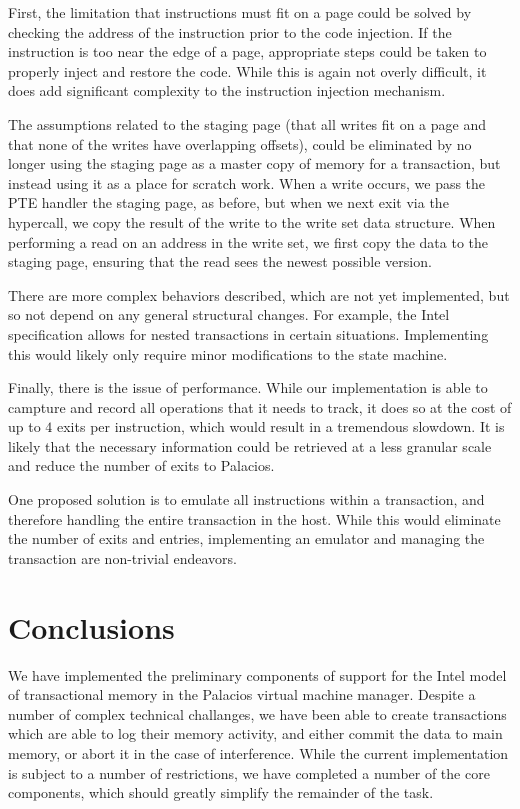\documentclass{acm_proc_article-sp}
\begin{document}
First, the limitation that instructions must fit on a page could be solved by
checking the address of the instruction prior to the code injection. If the 
instruction is too near the edge of a page, appropriate steps could be taken
to properly inject and restore the code. While this is again not overly 
difficult, it does add significant complexity to the instruction injection
mechanism.

The assumptions related to the staging page (that all writes fit on a page
and that none of the writes have overlapping offsets), could be eliminated
by no longer using the staging page as a master copy of memory for a 
transaction, but instead using it as a place for scratch work. When a 
write occurs, we pass the PTE handler the staging page, as before, but when we 
next exit via the hypercall, we copy the result of the write to the write set
data structure. When performing a read on an address in the write set,
we first copy the data to the staging page, ensuring that the read sees the
newest possible version.

There are more complex behaviors described, which are not yet
implemented, but so not depend on any general structural changes. For example,
the Intel specification allows for nested transactions in certain situations.
Implementing this would likely only require minor modifications to the state
machine. 

Finally, there is the issue of performance. While our implementation is able 
to campture and record all operations that it needs to track, it does so at the
cost of up to $4$ exits per instruction, which would result in a tremendous
slowdown. It is likely that the necessary information could be retrieved at a 
less granular scale and reduce the number of exits to Palacios.

One proposed solution is to emulate all instructions within a transaction,
and therefore handling the entire transaction in the host. While this would
eliminate the number of exits and entries, implementing an emulator and managing
the transaction are non-trivial endeavors. 
  
\section{Conclusions}

We have implemented the preliminary components of support for the Intel model
of transactional memory in the Palacios virtual machine manager. Despite a 
number of complex technical challanges, we have been able to create
transactions which are able to log their memory activity, and either commit
the data to main memory, or abort it in the case of interference. While the
current implementation is subject to a number of restrictions, we have 
completed a number of the core components, which should greatly simplify 
the remainder of the task.
\end{document}
